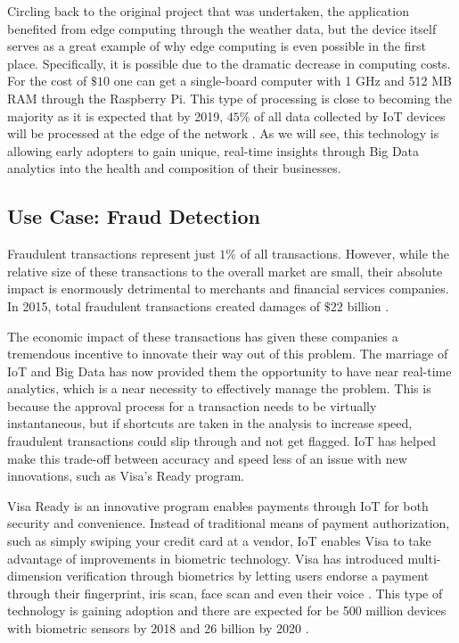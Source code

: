 \documentclass[sigconf]{acmart}
\begin{document}
Circling back to the original project that was undertaken, the application benefited from edge computing through the weather data, but the device itself serves as a great example of why edge computing is even possible in the first place. Specifically, it is possible due to the dramatic decrease in computing costs. For the cost of $\$10$ one can get a single-board computer with 1 GHz and 512 MB RAM through the Raspberry Pi. This type of processing is close to becoming the majority as it is expected that by 2019, $45\%$ of all data collected by IoT devices will be processed at the edge of the network \cite{msft}. As we will see, this technology is allowing early adopters to gain unique, real-time insights through Big Data analytics into the health and composition of their businesses.

\subsection{Use Case: Fraud Detection}
Fraudulent transactions represent just $1\%$ of all transactions. However, while the relative size of these transactions to the overall market are small, their absolute impact is enormously detrimental to merchants and financial services companies. In 2015, total fraudulent transactions created damages of $\$22$ billion \cite{fraud}.

The economic impact of these transactions has given these companies a tremendous incentive to innovate their way out of this problem. The marriage of IoT and Big Data has now provided them the opportunity to have near real-time analytics, which is a near necessity to effectively manage the problem. This is because the approval process for a transaction needs to be virtually instantaneous, but if shortcuts are taken in the analysis to increase speed, fraudulent transactions could slip through and not get flagged. IoT has helped make this trade-off between accuracy and speed less of an issue with new innovations, such as Visa's Ready program. 

Visa Ready is an innovative program enables payments through IoT for both security and convenience. Instead of traditional means of payment authorization, such as simply swiping your credit card at a vendor, IoT enables Visa to take advantage of improvements in biometric technology. \cite{visa} Visa has introduced multi-dimension verification through biometrics by letting users endorse a payment through their fingerprint, iris scan, face scan and even their voice \cite{biometric}. This type of technology is gaining adoption and there are expected for be 500 million devices with biometric sensors by 2018 and 26 billion by 2020 \cite{biometricsensors}. 
\end{document}
